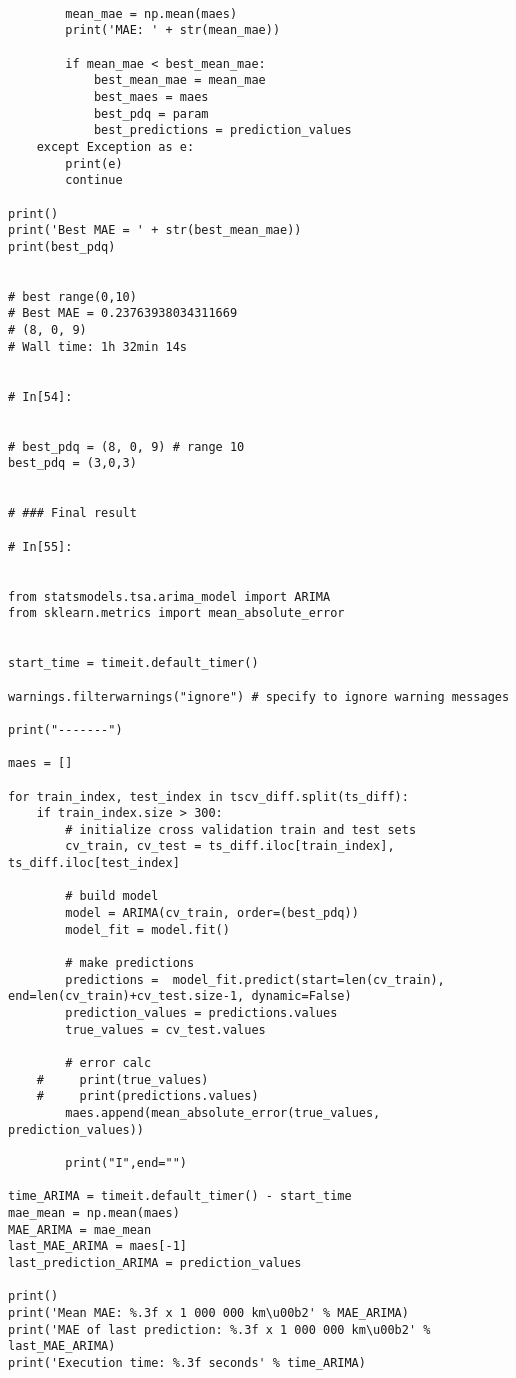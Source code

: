 \begin{verbatim}
        
        mean_mae = np.mean(maes)
        print('MAE: ' + str(mean_mae))    

        if mean_mae < best_mean_mae:
            best_mean_mae = mean_mae
            best_maes = maes
            best_pdq = param
            best_predictions = prediction_values
    except Exception as e:
        print(e)
        continue
   
print()
print('Best MAE = ' + str(best_mean_mae))
print(best_pdq)


# best range(0,10)
# Best MAE = 0.23763938034311669
# (8, 0, 9)
# Wall time: 1h 32min 14s


# In[54]:


# best_pdq = (8, 0, 9) # range 10
best_pdq = (3,0,3)


# ### Final result

# In[55]:


from statsmodels.tsa.arima_model import ARIMA
from sklearn.metrics import mean_absolute_error


start_time = timeit.default_timer()

warnings.filterwarnings("ignore") # specify to ignore warning messages

print("-------")

maes = []

for train_index, test_index in tscv_diff.split(ts_diff):
    if train_index.size > 300:
        # initialize cross validation train and test sets
        cv_train, cv_test = ts_diff.iloc[train_index], ts_diff.iloc[test_index]

        # build model
        model = ARIMA(cv_train, order=(best_pdq))
        model_fit = model.fit()

        # make predictions
        predictions =  model_fit.predict(start=len(cv_train), end=len(cv_train)+cv_test.size-1, dynamic=False)
        prediction_values = predictions.values
        true_values = cv_test.values

        # error calc
    #     print(true_values)
    #     print(predictions.values)
        maes.append(mean_absolute_error(true_values, prediction_values))

        print("I",end="")

time_ARIMA = timeit.default_timer() - start_time
mae_mean = np.mean(maes)
MAE_ARIMA = mae_mean
last_MAE_ARIMA = maes[-1]
last_prediction_ARIMA = prediction_values

print()
print('Mean MAE: %.3f x 1 000 000 km\u00b2' % MAE_ARIMA)
print('MAE of last prediction: %.3f x 1 000 000 km\u00b2' % last_MAE_ARIMA)
print('Execution time: %.3f seconds' % time_ARIMA)


\end{verbatim}
